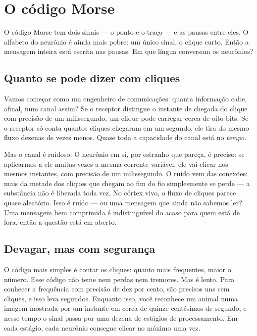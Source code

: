 \chapter{O código Morse}

O código Morse tem dois sinais --- o ponto e o traço --- e as pausas entre eles. O alfabeto do neurônio é ainda mais pobre: um único sinal, o clique curto. Então a mensagem inteira está escrita nas pausas. Em que língua conversam os neurônios?

\section*{Quanto se pode dizer com cliques}

Vamos começar como um engenheiro de comunicações: quanta informação cabe, afinal, num canal assim? Se o receptor distingue o instante de chegada do clique com precisão de um milissegundo, um clique pode carregar cerca de oito bits. Se o receptor só conta quantos cliques chegaram em um segundo, ele tira do mesmo fluxo dezenas de vezes menos. Quase toda a capacidade do canal está no \emph{tempo}.


Mas o canal é ruidoso. O neurônio em si, por estranho que pareça, é preciso: se aplicarmos a ele muitas vezes a mesma corrente variável, ele vai clicar nos mesmos instantes, com precisão de um milissegundo. O ruído vem das conexões: mais da metade dos cliques que chegam ao fim do fio simplesmente se perde --- a substância não é liberada toda vez. No córtex vivo, o fluxo de cliques parece quase aleatório. Isso é ruído --- ou uma mensagem que ainda não sabemos ler? Uma mensagem bem comprimida é indistinguível do acaso para quem está de fora, então a questão está em aberto.

\section*{Devagar, mas com segurança}

O código mais simples é contar os cliques: quanto mais frequentes, maior o número. Esse código não teme nem perdas nem tremores. Mas é lento. Para conhecer a frequência com precisão de dez por cento, são precisos uns cem cliques, e isso leva segundos. Enquanto isso, você reconhece um animal numa imagem mostrada por um instante em cerca de quinze centésimos de segundo, e nesse tempo o sinal passa por uma dezena de estágios de processamento. Em cada estágio, cada neurônio consegue clicar no máximo uma vez.

